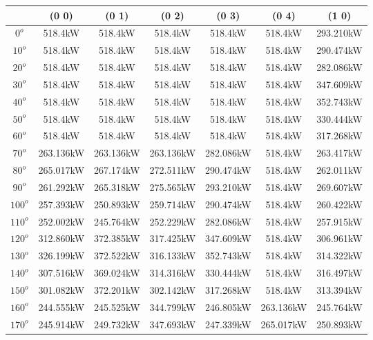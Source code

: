         \singlespacing
        \begin{table}[H]
        	\centering
        	\begin{tabular}{|c|c|c|c|c|c|c|} \hline
        			& (0 0)		& (0 1)		& (0 2)		& (0 3)		& (0 4)		& (1 0)		\\ \hline
		$0^o$	& 518.4kW	& 518.4kW	& 518.4kW	& 518.4kW	& 518.4kW	& 293.210kW	\\ \hline
		$10^o$	& 518.4kW	& 518.4kW	& 518.4kW	& 518.4kW	& 518.4kW	& 290.474kW	\\ \hline
		$20^o$	& 518.4kW	& 518.4kW	& 518.4kW	& 518.4kW	& 518.4kW	& 282.086kW	\\ \hline
		$30^o$	& 518.4kW	& 518.4kW	& 518.4kW	& 518.4kW	& 518.4kW	& 347.609kW	\\ \hline
		$40^o$	& 518.4kW	& 518.4kW	& 518.4kW	& 518.4kW	& 518.4kW	& 352.743kW	\\ \hline
		$50^o$	& 518.4kW	& 518.4kW	& 518.4kW	& 518.4kW	& 518.4kW	& 330.444kW	\\ \hline
		$60^o$	& 518.4kW	& 518.4kW	& 518.4kW	& 518.4kW	& 518.4kW	& 317.268kW	\\ \hline
		$70^o$	& 263.136kW	& 263.136kW	& 263.136kW	& 282.086kW	& 518.4kW	& 263.417kW	\\ \hline
		$80^o$	& 265.017kW	& 267.174kW	& 272.511kW	& 290.474kW	& 518.4kW	& 262.011kW	\\ \hline
		$90^o$	& 261.292kW	& 265.318kW	& 275.565kW	& 293.210kW	& 518.4kW	& 269.607kW	\\ \hline
		$100^o$	& 257.393kW	& 250.893kW	& 259.714kW	& 290.474kW	& 518.4kW	& 260.422kW	\\ \hline
		$110^o$	& 252.002kW	& 245.764kW	& 252.229kW	& 282.086kW	& 518.4kW	& 257.915kW	\\ \hline
		$120^o$	& 312.860kW	& 372.385kW	& 317.425kW	& 347.609kW	& 518.4kW	& 306.961kW	\\ \hline
		$130^o$	& 326.199kW	& 372.522kW	& 316.133kW	& 352.743kW	& 518.4kW	& 314.322kW	\\ \hline
		$140^o$	& 307.516kW	& 369.024kW	& 314.316kW	& 330.444kW	& 518.4kW	& 316.497kW	\\ \hline
		$150^o$	& 301.082kW	& 372.201kW	& 302.142kW	& 317.268kW	& 518.4kW	& 313.394kW	\\ \hline
		$160^o$	& 244.555kW	& 245.525kW	& 344.799kW	& 246.805kW	& 263.136kW	& 245.764kW	\\ \hline
		$170^o$	& 245.914kW	& 249.732kW	& 347.693kW	& 247.339kW	& 265.017kW	& 250.893kW	\\ \hline

\end{tabular}
\end{table}
